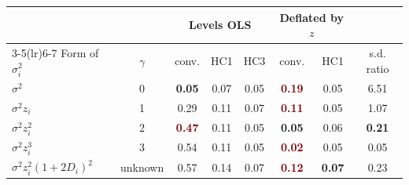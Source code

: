 \begin{tabular}{@{}lccccccc@{}}
\toprule
 & & \multicolumn{3}{c}{Levels OLS} & \multicolumn{2}{c}{Deflated by $z$} & \\
\cmidrule(lr){3-5}\cmidrule(lr){6-7}
Form of $\sigma_i^2$ & $\gamma$ & conv. & HC1 & HC3 & conv. & HC1 & s.d. ratio \\
\midrule
$\sigma^2$ & 0 & \textcolor{DeepNavy}{\bfseries 0.05} & 0.07 & 0.05 & \textcolor{Maroon}{\bfseries 0.19} & 0.05 & 6.51 \\
$\sigma^2 z_i$ & 1 & 0.29 & 0.11 & 0.07 & \textcolor{Maroon}{\bfseries 0.11} & 0.05 & 1.07 \\
$\sigma^2 z_i^2$ & 2 & \textcolor{Maroon}{\bfseries 0.47} & 0.11 & 0.05 & \textcolor{DeepNavy}{\bfseries 0.05} & 0.06 & \textcolor{DeepNavy}{\bfseries 0.21} \\
$\sigma^2 z_i^3$ & 3 & 0.54 & 0.11 & 0.05 & \textcolor{Maroon}{\bfseries 0.02} & 0.05 & 0.05 \\
$\sigma^2 z_i^2 (1 + 2D_i)^2$ & unknown & 0.57 & 0.14 & 0.07 & \textcolor{Maroon}{\bfseries 0.12} & \textcolor{DeepNavy}{\bfseries 0.07} & 0.23 \\
\bottomrule
\end{tabular}
